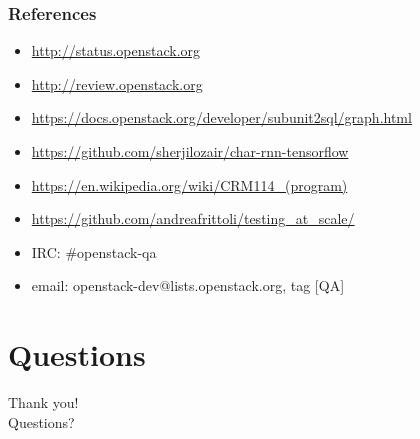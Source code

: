 \documentclass[aspectratio=169,11pt,hyperref={colorlinks=true}]{beamer}
\begin{document}
\begin{frame}
    \frametitle{References}
    \begin{itemize}
        \item{\href{http://status.openstack.org}{http://status.openstack.org}}
        \item{\href{http://review.openstack.org}{http://review.openstack.org}}
        \item{\href{https://docs.openstack.org/developer/subunit2sql/graph.html}{https://docs.openstack.org/developer/subunit2sql/graph.html}}
        \item{\href{https://github.com/sherjilozair/char-rnn-tensorflow}{https://github.com/sherjilozair/char-rnn-tensorflow}}
        \item{\href{https://en.wikipedia.org/wiki/CRM114\_(program)}{https://en.wikipedia.org/wiki/CRM114\_(program)}}
        \item{\href{https://github.com/andreafrittoli/testing\_at\_scale/}{https://github.com/andreafrittoli/testing\_at\_scale/}}
    \end{itemize}
    \begin{itemize}
        \item{IRC: \#openstack-qa}
        \item{email: openstack-dev@lists.openstack.org, tag [QA]}
    \end{itemize}
\end{frame}


\section{Questions}
\begin{frame}[c]
    \begin{center}
        \Huge Thank you!\\Questions?
    \end{center}
\end{frame}
\end{document}
